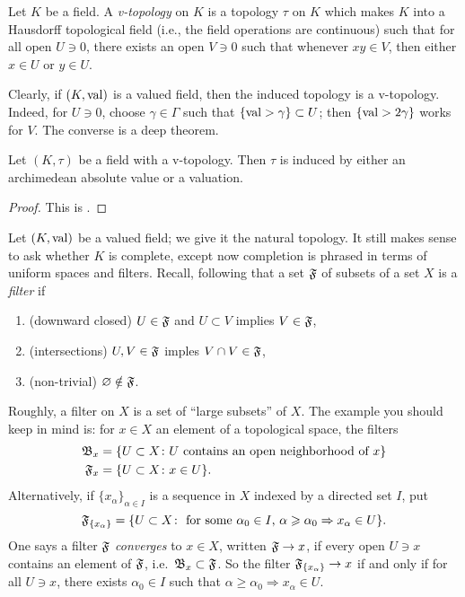 \begin{definition}
Let $K$ be a field. A \emph{v-topology} on $K$ is a topology $\tau$ on $K$ 
which makes $K$ into a Hausdorff topological field (i.e., the field operations 
are continuous) such that for all open $U\ni 0$, there exists an open 
$V\ni 0$ such that whenever $x y\in V$, then either $x\in U$ or $y\in U$. 
\end{definition}

Clearly, if $(K,\operatorname{val})$ is a valued field, then the induced topology is 
a v-topology. Indeed, for $U\ni 0$, choose $\gamma\in \Gamma$ such that 
$\{\operatorname{val}>\gamma\}\subset U$; then $\{\operatorname{val}>2\gamma\}$ works for $V$. 
The converse is a deep theorem.

\begin{theorem}
Let $(K,\tau)$ be a field with a v-topology. Then $\tau$ is induced by either 
an archimedean absolute value or a valuation. 
\end{theorem}
\begin{proof}
This is \cite[B.1]{engler-prestel}.
\end{proof}

Let $(K,\operatorname{val})$ be a valued field; we give it the natural topology. It 
still makes sense to ask whether $K$ is complete, except now completion is 
phrased in terms of uniform spaces and filters. Recall, following 
\cite[I \S 6.1]{bourbaki-gentop1} that a set $\mathfrak{F}$ of subsets of a set $X$ is 
a \emph{filter} if 
\begin{enumerate}
\item
(downward closed)
$U\in \mathfrak{F}$ and $U\subset V$ implies $V\in \mathfrak{F}$, 

\item
(intersections)
$U,V\in \mathfrak{F}$ imples $V\cap V\in \mathfrak{F}$, 

\item
(non-trivial)
$\varnothing\notin \mathfrak{F}$. 
\end{enumerate}
Roughly, a filter on $X$ is a set of ``large subsets'' of $X$. The example you 
should keep in mind is: for $x\in X$ an element of a topological space, the 
filters
\begin{align*}
  \mathfrak{B}_x &= \{U\subset X\colon U\text{ contains an open neighborhood of }x\} \\
  \mathfrak{F}_x &= \{U\subset X\colon x\in U\} .
\end{align*}
Alternatively, if $\{x_\alpha\}_{\alpha\in I}$ is a sequence in $X$ indexed by 
a directed set $I$, put 
\[
  \mathfrak{F}_{\{x_\alpha\}} = \{U\subset X\colon \text{ for some $\alpha_0\in I$, $\alpha\geqslant \alpha_0\Rightarrow x_\alpha\in U$}\} .
\]
One says a filter $\mathfrak{F}$ \emph{converges} to $x\in X$, written $\mathfrak{F}\to x$, if 
every open $U\ni x$ contains an element of $\mathfrak{F}$, i.e.~$\mathfrak{B}_x\subset \mathfrak{F}$. So 
the filter $\mathfrak{F}_{\{x_\alpha\}}\to x$ if and only if for all $U\ni x$, there 
exists $\alpha_0\in I$ such that 
$\alpha\geqslant \alpha_0\Rightarrow x_\alpha\in U$. 

